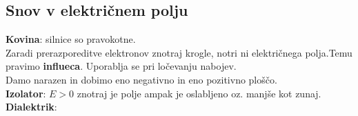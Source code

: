 {\color{indiagreen}\subsection{Snov v električnem polju}}
\textbf{Kovina}:
silnice so pravokotne.\\
Zaradi prerazporeditve elektronov znotraj krogle, notri ni električnega polja.Temu pravimo \textbf{influeca}. Uporablja se pri ločevanju nabojev.\\
Damo narazen in dobimo eno negativno in eno pozitivno ploščo.\\
\textbf{Izolator}:
$E > 0$ znotraj je polje ampak je oslabljeno oz. manjše kot zunaj.\\
\textbf{Dialektrik}:

